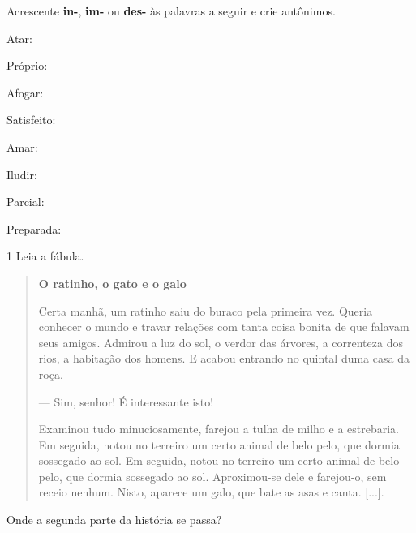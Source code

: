 Acrescente \textbf{in-}, \textbf{im-} ou \textbf{des-} às palavras a seguir e crie antônimos.

\begin{escolha}
\item Atar: 

\item Próprio: 

\item Afogar: 

\item Satisfeito: 

\item Amar: 

\item Iludir: 

\item Parcial: 

\item Preparada: 
\end{escolha}


\num{1} Leia a fábula.

\begin{quote}
\textbf{O ratinho, o gato e o galo}

Certa manhã, um ratinho saiu do buraco pela primeira vez. Queria
conhecer o mundo e travar relações com tanta coisa bonita de que falavam
seus amigos. Admirou a luz do sol, o verdor das árvores, a correnteza
dos rios, a habitação dos homens. E acabou entrando no quintal duma casa
da roça.

--- Sim, senhor! É interessante isto!

Examinou tudo minuciosamente, farejou a tulha de milho e a estrebaria.
Em seguida, notou no terreiro um certo animal de belo pelo, que dormia
sossegado ao sol. Em seguida, notou no terreiro um certo animal de belo
pelo, que dormia sossegado ao sol. Aproximou-se dele e farejou-o, sem
receio nenhum. Nisto, aparece um galo, que bate as asas e canta.
{[}...{]}.

\end{quote}

\pagebreak
Onde a segunda parte da história se passa?

